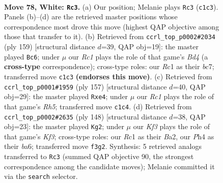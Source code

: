 \documentclass[11pt]{article}
\begin{document}
\clearpage

\begin{figure}[p]\centering
\begin{subfigure}{0.46\textwidth}\centering
\resizebox{\linewidth}{!}{%
\newchessgame
\chessboard[
  setfen={8/8/p2k3r/Ppp2p1p/2p2P1P/4PKP1/1P6/2R5 w - - 1 78},
  showmover=false,
  pgfstyle=straightmove, color=movearrow, markmove={c1-c3}
]}
\caption{}
\end{subfigure}\hfill
\begin{subfigure}{0.46\textwidth}\centering
\resizebox{\linewidth}{!}{%
\newchessgame
\chessboard[
  setfen={8/2B5/8/1p1b2pk/p4p1p/P4P1P/1P4P1/6K1 b - - 5 80},
  showmover=false,
  pgfstyle=straightmove, color=movearrow, markmove={d5-c6}
]}
\caption{}
\end{subfigure}
\\[4pt]
\begin{subfigure}{0.46\textwidth}\centering
\resizebox{\linewidth}{!}{%
\newchessgame
\chessboard[
  setfen={R7/4kp2/3p1p2/p1p2P2/P1P1P2r/1P6/2K5/8 b - - 7 79},
  showmover=false,
  pgfstyle=straightmove, color=movearrow, markmove={h4-e4}
]}
\caption{}
\end{subfigure}\hfill
\begin{subfigure}{0.46\textwidth}\centering
\resizebox{\linewidth}{!}{%
\newchessgame
\chessboard[
  setfen={8/8/b1P1p1k1/1p1p1p2/1P1P1P2/p3PK1P/B7/8 w - - 6 75},
  showmover=false,
  pgfstyle=straightmove, color=movearrow, markmove={f3-g2}
]}
\caption{}
\end{subfigure}
\caption{\textbf{Move 78, White: \texttt{Rc3}.} (a) Our position; Melanie plays \texttt{Rc3} (\texttt{c1c3}). Panels (b)--(d) are the retrieved master positions whose correspondence most drove this move (highest QAP objective among those that transfer to it). (b) Retrieved from \texttt{ccrl\_top\_p0002\#2034} (ply 159) [structural distance $d$=39, QAP obj=19]: the master played \texttt{Bc6}; under $\mu$ our \emph{Rc1} plays the role of that game's \emph{Bd4} (a \textbf{cross-type} correspondence); cross-type roles: our \emph{R}c1 as their \emph{b}c7; transferred move \texttt{c1c3} \textbf{(endorses this move)}. (c) Retrieved from \texttt{ccrl\_top\_p0001\#1959} (ply 157) [structural distance $d$=40, QAP obj=29]: the master played \texttt{Rxe4}; under $\mu$ our \emph{Rc1} plays the role of that game's \emph{Rh5}; transferred move \texttt{c1c4}. (d) Retrieved from \texttt{ccrl\_top\_p0002\#2635} (ply 148) [structural distance $d$=38, QAP obj=23]: the master played \texttt{Kg2}; under $\mu$ our \emph{Kf3} plays the role of that game's \emph{Kf3}; cross-type roles: our \emph{R}c1 as their \emph{B}a2, our \emph{P}h4 as their \emph{b}a6; transferred move \texttt{f3g2}. Synthesis: 5 retrieved analogs transferred to \texttt{Rc3} (summed QAP objective 90, the strongest correspondence among the candidate moves); Melanie committed it via the \texttt{search} selector.}
\label{fig:thought-m154}
\end{figure}
\end{document}
